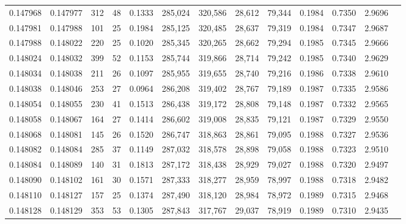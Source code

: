 \begin{tabular}{rrrrrrrrrrrrr}
0.147968 & 0.147977 &   312 &  48 &                                     0.1333 & 285,024 & 320,586 &  28,612 &  79,344 & 0.1984 & 0.7350 & 2.9696 \\
0.147981 & 0.147988 &   101 &  25 &                                     0.1984 & 285,125 & 320,485 &  28,637 &  79,319 & 0.1984 & 0.7347 & 2.9687 \\
0.147988 & 0.148022 &   220 &  25 &                                     0.1020 & 285,345 & 320,265 &  28,662 &  79,294 & 0.1985 & 0.7345 & 2.9666 \\
0.148024 & 0.148032 &   399 &  52 &                                     0.1153 & 285,744 & 319,866 &  28,714 &  79,242 & 0.1985 & 0.7340 & 2.9629 \\
0.148034 & 0.148038 &   211 &  26 &                                     0.1097 & 285,955 & 319,655 &  28,740 &  79,216 & 0.1986 & 0.7338 & 2.9610 \\
0.148038 & 0.148046 &   253 &  27 &                                     0.0964 & 286,208 & 319,402 &  28,767 &  79,189 & 0.1987 & 0.7335 & 2.9586 \\
0.148054 & 0.148055 &   230 &  41 &                                     0.1513 & 286,438 & 319,172 &  28,808 &  79,148 & 0.1987 & 0.7332 & 2.9565 \\
0.148058 & 0.148067 &   164 &  27 &                                     0.1414 & 286,602 & 319,008 &  28,835 &  79,121 & 0.1987 & 0.7329 & 2.9550 \\
0.148068 & 0.148081 &   145 &  26 &                                     0.1520 & 286,747 & 318,863 &  28,861 &  79,095 & 0.1988 & 0.7327 & 2.9536 \\
0.148082 & 0.148084 &   285 &  37 &                                     0.1149 & 287,032 & 318,578 &  28,898 &  79,058 & 0.1988 & 0.7323 & 2.9510 \\
0.148084 & 0.148089 &   140 &  31 &                                     0.1813 & 287,172 & 318,438 &  28,929 &  79,027 & 0.1988 & 0.7320 & 2.9497 \\
0.148090 & 0.148102 &   161 &  30 &                                     0.1571 & 287,333 & 318,277 &  28,959 &  78,997 & 0.1988 & 0.7318 & 2.9482 \\
0.148110 & 0.148127 &   157 &  25 &                                     0.1374 & 287,490 & 318,120 &  28,984 &  78,972 & 0.1989 & 0.7315 & 2.9468 \\
0.148128 & 0.148129 &   353 &  53 &                                     0.1305 & 287,843 & 317,767 &  29,037 &  78,919 & 0.1989 & 0.7310 & 2.9435 \\

\end{tabular}
